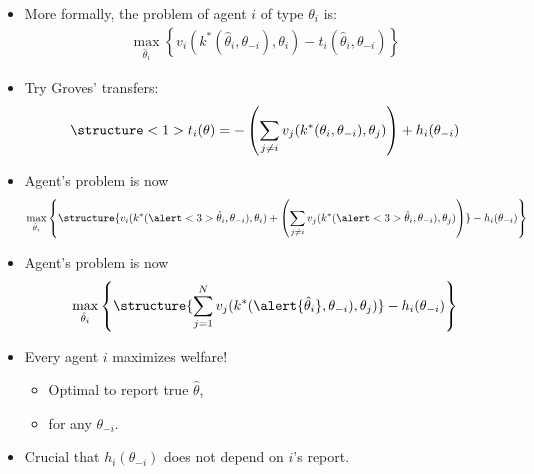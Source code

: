 \documentclass[english,handout]{beamer}		%
\def\lyxframeend{} %
\begin{document}
\begin{itemize}
	\item More formally, the problem of agent $i$ of type $\theta_i$ is:
		\vspace{-0.5em}\begin{align*}
		\max_{\hat{\theta}_i} \left\{  v_i(k^*(\hat{\theta}_i,\theta_{-i}),\theta_i) - t_i(\hat{\theta}_i,\theta_{-i}) \right\}
		\end{align*}\vspace{-1em}
	\item Try \alert<1>{Groves' transfers}:
		\vspace{-0.5em}\begin{align*}
		\structure<1>{ t_{i}(\theta)=-\left(\sum_{j\neq i} v_{j}(k^*(\theta_i, \theta_{-i}), \theta_{j}) \right) + h_{i}(\theta_{-i}) }
		\end{align*}\vspace{-1em}
	\pause
	\item Agent's problem is now
		\vspace{-0.5em}\begin{align*}
		\max_{\hat{\theta}_i} \left\{ \structure{v_i(k^*(\alert<3>{\hat{\theta}_i},\theta_{-i}),\theta_i) + \left( \sum_{j\neq i} v_{j}(k^*(\alert<3>{\hat{\theta}_i},\theta_{-i}), \theta_{j}) \right)} - h_{i}(\theta_{-i}) \right\}
		\end{align*}\vspace{-1em}
\end{itemize}
\lyxframeend


\begin{itemize}
	\item Agent's problem is now
		\vspace{-0.5em}\begin{align*}
		\max_{\hat{\theta}_i} \left\{ \structure{ \sum_{j=1}^N v_{j}(k^*(\alert{\hat{\theta}_i},\theta_{-i}), \theta_{j}) } - h_{i}(\theta_{-i}) \right\}
		\end{align*}\vspace{-1em}
	\item Every agent $i$ maximizes welfare!
	\begin{itemize}
		\item Optimal to report true $\hat{\theta}$,
		\item for any $\theta_{-i}$.
	\end{itemize}
	\item Crucial that $h_i(\theta_{-i})$ does not depend on $i$'s report.
\end{itemize}
\lyxframeend
\end{document}
